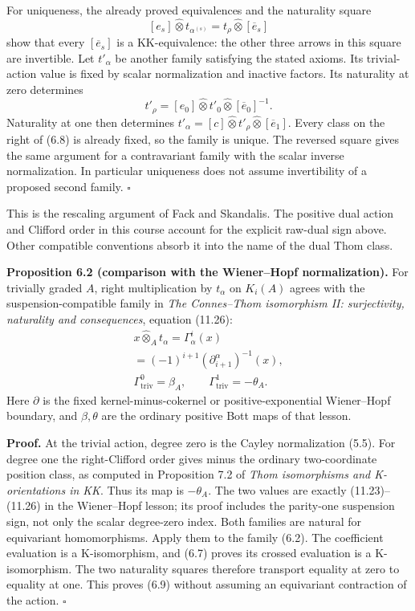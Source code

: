 \documentclass[
  11pt,
]{article}
\begin{document}
For uniqueness, the already proved equivalences and the naturality
square \[
[e_s]\widehat\otimes t_{\alpha^{(s)}}
 =t_\rho\widehat\otimes[\overline e_s]
\tag{6.7}
\] show that every \([\overline e_s]\) is a KK-equivalence: the other
three arrows in this square are invertible. Let \(t'_\alpha\) be another
family satisfying the stated axioms. Its trivial-action value is fixed
by scalar normalization and inactive factors. Its naturality at zero
determines \[
t'_\rho=[e_0]\widehat\otimes t'_0
                       \widehat\otimes[\overline e_0]^{-1}.
\tag{6.8}
\] Naturality at one then determines
\(t'_\alpha=[c]\widehat\otimes t'_\rho\widehat\otimes[\overline e_1]\).
Every class on the right of (6.8) is already fixed, so the family is
unique. The reversed square gives the same argument for a contravariant
family with the scalar inverse normalization. In particular uniqueness
does not assume invertibility of a proposed second family. \(\square\)

This is the rescaling argument of Fack and Skandalis. The positive dual
action and Clifford order in this course account for the explicit
raw-dual sign above. Other compatible conventions absorb it into the
name of the dual Thom class.

\textbf{Proposition 6.2 (comparison with the Wiener--Hopf
normalization).} For trivially graded \(A\), right multiplication by
\(t_\alpha\) on \(K_i(A)\) agrees with the suspension-compatible family
in \emph{The Connes--Thom isomorphism II: surjectivity, naturality and
consequences}, equation (11.26): \[
\begin{gathered}
x\widehat\otimes_At_\alpha=\Gamma_\alpha^i(x)\\
 =(-1)^{i+1}(\partial_{i+1}^\alpha)^{-1}(x),\\
\Gamma_{\mathrm{triv}}^0=\beta_A,\qquad
\Gamma_{\mathrm{triv}}^1=-\theta_A.
\end{gathered}
\tag{6.9}
\] Here \(\partial\) is the fixed kernel-minus-cokernel or
positive-exponential Wiener--Hopf boundary, and \(\beta,\theta\) are the
ordinary positive Bott maps of that lesson.

\textbf{Proof.} At the trivial action, degree zero is the Cayley
normalization (5.5). For degree one the right-Clifford order gives minus
the ordinary two-coordinate position class, as computed in Proposition
7.2 of \emph{Thom isomorphisms and K-orientations in KK}. Thus its map
is \(-\theta_A\). The two values are exactly (11.23)--(11.26) in the
Wiener--Hopf lesson; its proof includes the parity-one suspension sign,
not only the scalar degree-zero index. Both families are natural for
equivariant homomorphisms. Apply them to the family (6.2). The
coefficient evaluation is a K-isomorphism, and (6.7) proves its crossed
evaluation is a K-isomorphism. The two naturality squares therefore
transport equality at zero to equality at one. This proves (6.9) without
assuming an equivariant contraction of the action. \(\square\)
\end{document}
